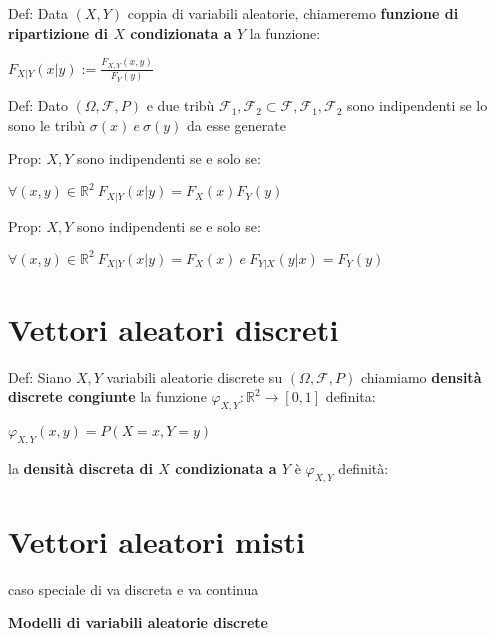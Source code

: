 \documentclass[11pt, letterpaper]{article}
\begin{document}
Def: Data $(X,Y)$ coppia di variabili aleatorie, chiameremo \textbf{funzione di ripartizione di $X$ condizionata a $Y$}
la funzione:
\begin{center}
    $F_{X|Y}(x|y):= \frac{F_{X,Y}(x,y)}{F_{Y}(y)}$
\end{center}

Def: Dato $(\Omega,\mathcal{F},P)$ e due tribù $\mathcal{F}_{1}, \mathcal{F}_{2}\subset\mathcal{F},\mathcal{F}_{1},
\mathcal{F}_{2}$ sono indipendenti se lo sono le tribù $\sigma(x)\ e\ \sigma(y)$ da esse generate 

Prop: $X,Y$ sono indipendenti se e solo se:
\begin{center}
    $\forall(x,y)\in\mathbb{R}^{2}\ F_{X|Y}(x|y)=F_{X}(x)F_{Y}(y)$    
\end{center}

Prop: $X,Y$ sono indipendenti se e solo se:
\begin{center}
    $\forall(x,y)\in\mathbb{R}^{2}\ F_{X|Y}(x|y)=F_{X}(x)\ e\ F_{Y|X}(y|x)=F_{Y}(y)$    
\end{center}

\section{Vettori aleatori discreti}

Def: Siano $X,Y$ variabili aleatorie discrete su $(\Omega,\mathcal{F},P)$ chiamiamo \textbf{densità discrete congiunte}
la funzione $\varphi_{X,Y}:\mathbb{R}^{2}\rightarrow [0,1]$ definita:
\begin{center}
        $\varphi_{X,Y}(x,y)=P(X=x, Y=y)$
\end{center}
la \textbf{densità discreta di $X$ condizionata a $Y$} è  $\varphi_{X,Y}$ definità:

\newpage
\thispagestyle{fancy}

\section{Vettori aleatori misti}
caso speciale di va discreta e va continua

\begin{center}
    \textbf{Modelli di variabili aleatorie discrete}
\end{center}
\end{document}
